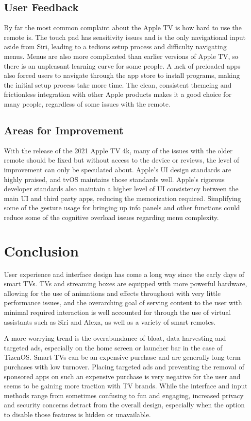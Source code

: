 \documentclass[12pt, letterpaper]{article}
\begin{document}
\subsection{User Feedback}
By far the most common complaint about the Apple TV is how hard to use the remote is. The touch pad has sensitivity issues and is the only navigational input aside from Siri, leading to a tedious setup process and difficulty navigating menus\cite{beergod}. Menus are also more complicated than earlier versions of Apple TV, so there is an unpleasant learning curve for some people. A lack of preloaded apps also forced users to navigate through the app store to install programs, making the initial setup process take more time.  The clean, consistent themeing and frictionless integration with other Apple products makes it a good choice for many people, regardless of some issues with the remote\cite{reader}.
\subsection{Areas for Improvement}
With the release of the 2021 Apple TV 4k, many of the issues with the older remote should be fixed but without access to the device or reviews, the level of improvement can only be speculated about. Apple's UI design standards are highly praised, and tvOS maintains those standards well. Apple's rigorous developer standards also maintain a higher level of UI consistency between the main UI and third party apps, reducing the memorization required. Simplifying some of the gesture usage for bringing up info panels and other functions could reduce some of the cognitive overload issues regarding menu complexity.
\section{Conclusion}
User experience and interface design has come a long way since the early days of smart TVs. TVs and streaming boxes are equipped with more powerful hardware, allowing for the use of animations and effects throughout with very little performance issues, and the overarching goal of serving content to the user with minimal required interaction is well accounted for through the use of virtual assistants such as Siri and Alexa, as well as a variety of smart remotes. 

A more worrying trend is the overabundance of bloat, data harvesting and targeted ads, especially on the home screen or launcher bar in the case of TizenOS. Smart TVs can be an expensive purchase and are generally long-term purchases with low turnover. Placing targeted ads and preventing the removal of sponsored apps on 
such an expensive purchase is very negative for the user and seems to be gaining more traction with TV brands.  While the interface and input methods range from sometimes confusing to fun and engaging, increased privacy and security concerns detract from the overall design, especially when the option to disable those features is hidden or unavailable.
\newpage
\printbibliography
\end{document}
